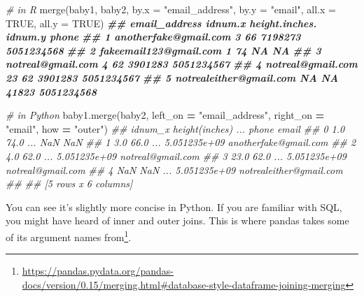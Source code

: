 \documentclass[
  12pt,
  krantz2]{krantz}
\makeatletter
\newenvironment{Shaded}{\begin{snugshade}}{\end{snugshade}}
\newcommand{\AttributeTok}[1]{\textcolor[rgb]{0.61,0.61,0.61}{#1}}
\newcommand{\CommentTok}[1]{\textcolor[rgb]{0.37,0.37,0.37}{\textit{#1}}}
\newcommand{\ConstantTok}[1]{\textcolor[rgb]{0,0,0}{#1}}
\newcommand{\DocumentationTok}[1]{\textcolor[rgb]{0.37,0.37,0.37}{\textbf{\textit{#1}}}}
\newcommand{\FunctionTok}[1]{\textcolor[rgb]{0,0,0}{#1}}
\newcommand{\NormalTok}[1]{#1}
\newcommand{\OperatorTok}[1]{\textcolor[rgb]{0.43,0.43,0.43}{\textbf{#1}}}
\newcommand{\StringTok}[1]{\textcolor[rgb]{0.5,0.5,0.5}{#1}}
\renewcommand{\href}[2]{#2\footnote{\url{#1}}}
\newenvironment{kframe}{%
\medskip{}
\setlength{\fboxsep}{.8em}
 \def\at@end@of@kframe{}%
 \ifinner\ifhmode%
  \def\at@end@of@kframe{\end{minipage}}%
  \begin{minipage}{\columnwidth}%
 \fi\fi%
 \def\FrameCommand##1{\hskip\@totalleftmargin \hskip-\fboxsep
 \colorbox{shadecolor}{##1}\hskip-\fboxsep
     \hskip-\linewidth \hskip-\@totalleftmargin \hskip\columnwidth}%
 \MakeFramed {\advance\hsize-\width
   \@totalleftmargin\z@ \linewidth\hsize
   \@setminipage}}%
 {\par\unskip\endMakeFramed%
 \at@end@of@kframe}
\renewenvironment{Shaded}{\begin{kframe}}{\end{kframe}}
\makeatother
\begin{document}
\begin{Shaded}
\begin{Highlighting}[]
\CommentTok{\# in R}
\FunctionTok{merge}\NormalTok{(baby1, baby2, }
      \AttributeTok{by.x =} \StringTok{"email\_address"}\NormalTok{, }\AttributeTok{by.y =} \StringTok{"email"}\NormalTok{, }
      \AttributeTok{all.x =} \ConstantTok{TRUE}\NormalTok{, }\AttributeTok{all.y =} \ConstantTok{TRUE}\NormalTok{)}
\DocumentationTok{\#\#             email\_address idnum.x height.inches. idnum.y      phone}
\DocumentationTok{\#\# 1   anotherfake@gmail.com       3             66 7198273 5051234568}
\DocumentationTok{\#\# 2  fakeemail123@gmail.com       1             74      NA         NA}
\DocumentationTok{\#\# 3       notreal@gmail.com       4             62 3901283 5051234567}
\DocumentationTok{\#\# 4       notreal@gmail.com      23             62 3901283 5051234567}
\DocumentationTok{\#\# 5 notrealeither@gmail.com      NA             NA   41823 5051234568}
\end{Highlighting}
\end{Shaded}

\begin{Shaded}
\begin{Highlighting}[]
\CommentTok{\# in Python}
\NormalTok{baby1.merge(baby2, }
\NormalTok{            left\_on }\OperatorTok{=} \StringTok{"email\_address"}\NormalTok{, right\_on }\OperatorTok{=} \StringTok{"email"}\NormalTok{, }
\NormalTok{            how }\OperatorTok{=} \StringTok{"outer"}\NormalTok{)}
\CommentTok{\#\#    idnum\_x  height(inches)  ...         phone                    email}
\CommentTok{\#\# 0      1.0            74.0  ...           NaN                      NaN}
\CommentTok{\#\# 1      3.0            66.0  ...  5.051235e+09    anotherfake@gmail.com}
\CommentTok{\#\# 2      4.0            62.0  ...  5.051235e+09        notreal@gmail.com}
\CommentTok{\#\# 3     23.0            62.0  ...  5.051235e+09        notreal@gmail.com}
\CommentTok{\#\# 4      NaN             NaN  ...  5.051235e+09  notrealeither@gmail.com}
\CommentTok{\#\# }
\CommentTok{\#\# [5 rows x 6 columns]}
\end{Highlighting}
\end{Shaded}

You can see it's slightly more concise in Python. If you are familiar with SQL, you might have heard of inner and outer joins. This is where pandas \href{https://pandas.pydata.org/pandas-docs/version/0.15/merging.html\#database-style-dataframe-joining-merging}{takes some of its argument names from}.
\end{document}
